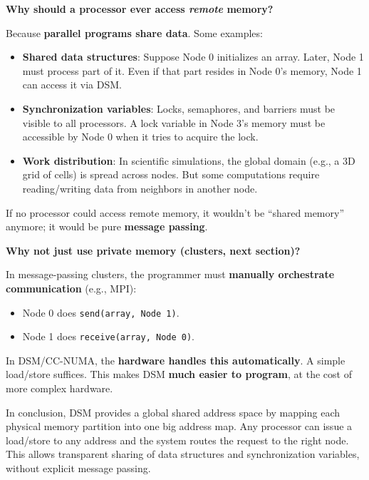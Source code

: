 \begin{takeawaysbox}
    \highspace
    \begin{flushleft}
        \textcolor{Green3}{ \textbf{Why should a processor ever access \emph{remote} memory?}}
    \end{flushleft}
    Because \textbf{parallel programs share data}. Some examples:
    \begin{itemize}
        \item \textbf{Shared data structures}: Suppose Node 0 initializes an array. Later, Node 1 must process part of it. Even if that part resides in Node 0's memory, Node 1 can access it via DSM.
        \item \textbf{Synchronization variables}: Locks, semaphores, and barriers must be visible to all processors. A lock variable in Node 3's memory must be accessible by Node 0 when it tries to acquire the lock.
        \item \textbf{Work distribution}: In scientific simulations, the global domain (e.g., a 3D grid of cells) is spread across nodes. But some computations require reading/writing data from neighbors in another node.
    \end{itemize}
    If no processor could access remote memory, it wouldn't be ``shared memory'' anymore; it would be pure \textbf{message passing}.

    \highspace
    \begin{flushleft}
        \textcolor{Green3}{ \textbf{Why not just use private memory (clusters, next section)?}}
    \end{flushleft}
    In message-passing clusters, the programmer must \textbf{manually orchestrate communication} (e.g., MPI):
    \begin{itemize}
        \item Node 0 does \texttt{send(array, Node 1)}.
        \item Node 1 does \texttt{receive(array, Node 0)}.
    \end{itemize}
    In DSM/CC-NUMA, the \textbf{hardware handles this automatically}. A simple load/store suffices. This makes DSM \textbf{much easier to program}, at the cost of more complex hardware.
\end{takeawaysbox}

\noindent
In conclusion, DSM provides a global shared address space by mapping each physical memory partition into one big address map. Any processor can issue a load/store to any address and the system routes the request to the right node. This allows transparent sharing of data structures and synchronization variables, without explicit message passing.